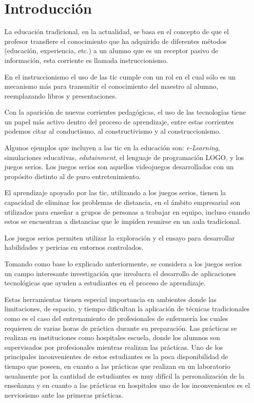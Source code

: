 \chapter{Introducción}
\label{chap:introduccion}

La educación tradicional, en la actualidad, se basa en el concepto de que el
profesor transfiere el conocimiento que ha adquirido de diferentes métodos
(educación, experiencia, etc.) a un alumno que es un receptor pasivo de
información, esta corriente es llamada
instruccionismo\cite{laptop:instructionism}. 

En el instruccionismo el uso de las \Gls{tic} cumple con un rol en el cual
sólo es un mecanismo más para transmitir el conocimiento del maestro al alumno,
reemplazando libros y presentaciones. 

Con la aparición de nuevas corrientes pedagógicas, el uso de las tecnologías
tiene un papel más activo dentro del proceso de aprendizaje, entre estas
corrientes podemos citar al conductismo, al constructivismo y al
construccionismo. 


Algunos ejemplos que incluyen a las \gls{tic} en la educación son:
\emph{e-Learning}, simulaciones educativas, \emph{edutainment}, el lenguaje de
programación LOGO, y los juegos serios. Los juegos serios son aquellos
videojuegos desarrollados con un propósito distinto al de puro entretenimiento.

El aprendizaje apoyado por las \Gls{tic}, utilizando a los juegos serios, tienen
la capacidad de eliminar los problemas de distancia, en el ámbito empresarial
son utilizados para enseñar a grupos de personas a trabajar en equipo, incluso
cuando estos se encuentran a distancias que le impiden reunirse en un aula
tradicional\cite{guenaga2013serious}. 

Los juegos serios permiten utilizar la exploración y el ensayo para desarrollar
habilidades y pericias en entornos
controlados\cite{humphreys2013developing,sg:aoverview}.
   
Tomando como base lo explicado anteriormente, se considera a los juegos serios
un campo interesante investigación que involucra el desarrollo de aplicaciones
tecnológicas que ayuden a estudiantes en el proceso de aprendizaje. 

Estas herramientas tienen especial importancia en ambientes donde las
limitaciones, de espacio, y tiempo dificultan la aplicación de técnicas
tradicionales\cite{education:games} como es el caso del entrenamiento de
profesionales de enfermería los cuales requieren de varias horas de práctica
durante su preparación. Las prácticas se realizan en instituciones como
hospitales escuela, donde los alumnos son supervisados por profesionales
mientras realizan las prácticas. Uno de los principales inconvenientes de estos
estudiantes es la poca disponibilidad de tiempo que poseen, en cuanto a las
prácticas que realizan en un laboratorio usualmente por la cantidad de
estudiantes es muy difícil la personalización de la enseñanza y en cuanto a las
prácticas en hospitales uno de los inconvenientes es el nerviosismo ante las
primeras prácticas.

